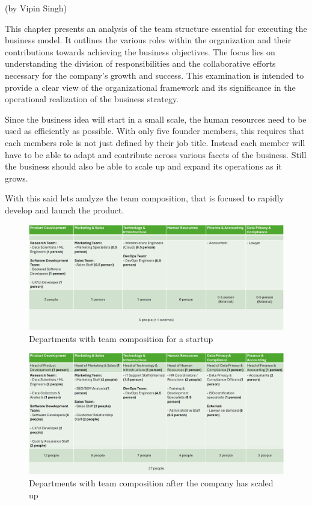 (by Vipin Singh)

This chapter presents an analysis of the team structure essential for executing the business model.
It outlines the various roles within the organization and their contributions towards achieving the business objectives.
The focus lies on understanding the division of responsibilities and the collaborative efforts necessary for the company's growth and success.
This examination is intended to provide a clear view of the organizational framework and its significance in the operational realization of the business strategy.

\p
Since the business idea will start in a small scale, the human resources need to be used as efficiently as possible.
With only five founder members, this requires that each members role is not just defined by their job title.
Instead each member will have to be able to adapt and contribute across various facets of the business.
Still the business should also be able to scale up and expand its operations as it grows.

\p
With this said lets analyze the team composition, that is focused to rapidly develop and launch the product.

\begin{figure}[H]
    \centering
    \includegraphics[width=\textwidth]{figures/team_comp_startup.png}
    \caption{Departments with team composition for a startup}
    \label{fig:team_comp_startup}
\end{figure}

\begin{figure}[H]
    \centering
    \includegraphics[width=\textwidth]{figures/team_comp_highscaled.png}
    \caption{Departments with team composition after the company has scaled up}
    \label{fig:team_comp_highscaled}
\end{figure}